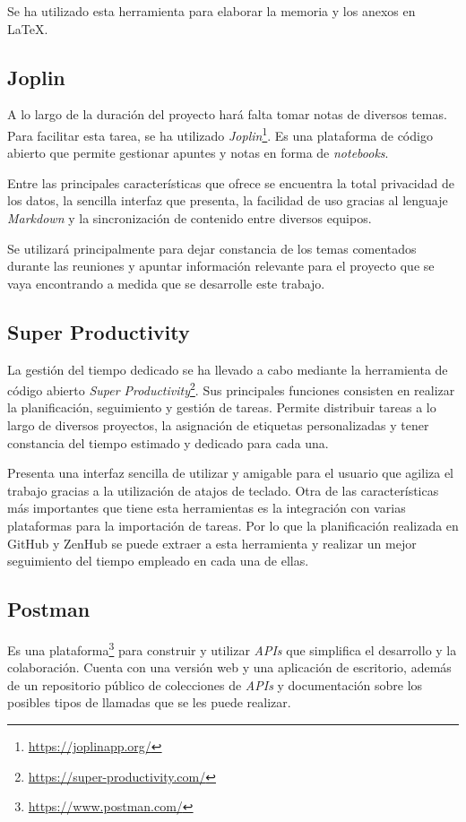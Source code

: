 Se ha utilizado esta herramienta para elaborar la memoria y los anexos en \LaTeX{}.

\subsection{Joplin}
A lo largo de la duración del proyecto hará falta tomar notas de diversos temas. Para facilitar esta tarea, se ha utilizado \textit{Joplin}\footnote{\url{https://joplinapp.org/}}. Es una plataforma de código abierto que permite gestionar apuntes y notas en forma de \textit{notebooks}.

Entre las principales características que ofrece se encuentra la total privacidad de los datos, la sencilla interfaz que presenta, la facilidad de uso gracias al lenguaje \textit{Markdown} y la sincronización de contenido entre diversos equipos.

Se utilizará principalmente para dejar constancia de los temas comentados durante las reuniones y apuntar información relevante para el proyecto que se vaya encontrando a medida que se desarrolle este trabajo.

\subsection{Super Productivity}
La gestión del tiempo dedicado se ha llevado a cabo mediante la herramienta de código abierto \textit{Super Productivity}\footnote{\url{https://super-productivity.com/}}. Sus principales funciones consisten en realizar la planificación, seguimiento y gestión de tareas. Permite distribuir tareas a lo largo de diversos proyectos, la asignación de etiquetas personalizadas y tener constancia del tiempo estimado y dedicado para cada una. 

Presenta una interfaz sencilla de utilizar y amigable para el usuario que agiliza el trabajo gracias a la utilización de atajos de teclado. Otra de las características más importantes que tiene esta herramientas es la integración con varias plataformas para la importación de tareas. Por lo que la planificación realizada en GitHub y ZenHub se puede extraer a esta herramienta y realizar un mejor seguimiento del tiempo empleado en cada una de ellas.

\subsection{Postman}

Es una plataforma\footnote{\url{https://www.postman.com/}} para construir y utilizar \textit{APIs} que simplifica el desarrollo y la colaboración. Cuenta con una versión web y una aplicación de escritorio, además de un repositorio público de colecciones de \textit{APIs} y documentación sobre los posibles tipos de llamadas que se les puede realizar.

